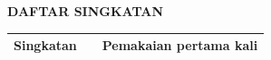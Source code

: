 \cleardoublepage
\vspace{2cm}
\begin{center}
{\fontsize{14}{16.8}\selectfont\textbf{DAFTAR SINGKATAN}}\\[1em]
\end{center}
\label{chap:singkatan}
\setcounter{chapter}{0}
\setcounter{section}{0}
\vspace{2em}



\begin{longtable}{@{} l >{\raggedright\arraybackslash}p{8cm} c @{}}
\multicolumn{1}{l}{\textbf{Singkatan}} & \multicolumn{1}{l}{\textbf{Kepanjangan}} & \multicolumn{1}{l}{\parbox[c]{2.5cm}{\raggedright \textbf{Pemakaian pertama kali}}} \\[0.5ex]
\hline
\endhead



\end{longtable}
